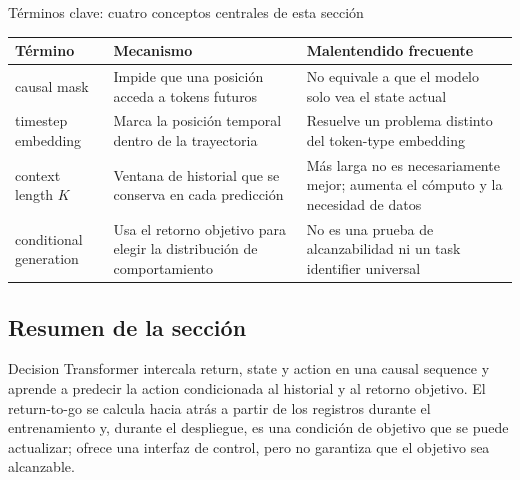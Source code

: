\begin{knowledgebox}{Términos clave: cuatro conceptos centrales de esta sección}
\begin{tabularx}{\textwidth}{L{3.0cm} X X}
\toprule
Término & Mecanismo & Malentendido frecuente \\
\midrule
causal mask & Impide que una posición acceda a tokens futuros & No equivale a que el modelo solo vea el state actual \\
timestep embedding & Marca la posición temporal dentro de la trayectoria & Resuelve un problema distinto del token-type embedding \\
context length $K$ & Ventana de historial que se conserva en cada predicción & Más larga no es necesariamente mejor; aumenta el cómputo y la necesidad de datos \\
conditional generation & Usa el retorno objetivo para elegir la distribución de comportamiento & No es una prueba de alcanzabilidad ni un task identifier universal \\
\bottomrule
\end{tabularx}
\end{knowledgebox}

\subsection{Resumen de la sección}

Decision Transformer intercala return, state y action en una causal sequence y aprende a predecir la action condicionada al historial y al retorno objetivo. El return-to-go se calcula hacia atrás a partir de los registros durante el entrenamiento y, durante el despliegue, es una condición de objetivo que se puede actualizar; ofrece una interfaz de control, pero no garantiza que el objetivo sea alcanzable.
